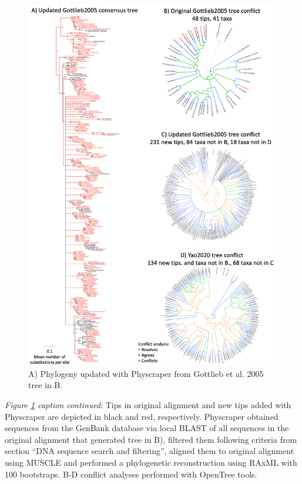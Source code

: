\documentclass[]{article}
\begin{document}
\begin{figure}
\includegraphics[width=1\linewidth]{../docs/figs/ilex-results} \caption{A) Phylogeny updated with Physcraper from Gottlieb et al. 2005 tree in B.}\label{fig:results}
\end{figure}

\newpage

\emph{Figure \ref{fig:results} caption continued}: Tips in original alignment and new tips added with Physcraper are depicted in black and red, respectively. Physcraper obtained sequences from the GenBank database via local BLAST of all sequences in the original alignment that generated tree in B), filtered them following criteria from section ``DNA sequence search and filtering'', aligned them to original alignment using MUSCLE and performed a phylogenetic reconstruction using RAxML with 100 bootstraps. B-D conflict analyses performed with OpenTree tools.
\end{document}
